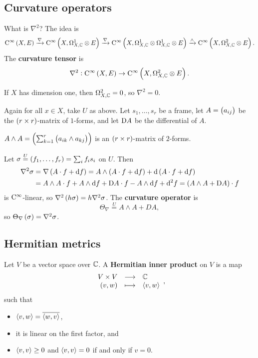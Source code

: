 \subsection{Curvature operators}

What is $ \nabla^2 $? The idea is
$$ \C^\infty\br{X, E} \xrightarrow{\nabla} \C^\infty\br{X, \Omega_{X, \CC}^1 \otimes E} \xrightarrow{\nabla} \C^\infty\br{X, \Omega_{X, \CC}^1 \otimes \Omega_{X, \CC}^1 \otimes E} \xrightarrow{\wedge} \C^\infty\br{X, \Omega_{X, \CC}^2 \otimes E}. $$
The \textbf{curvature tensor} is
$$ \nabla^2 : \C^\infty\br{X, E} \to \C^\infty\br{X, \Omega_{X, \CC}^2 \otimes E}. $$

\begin{remark*}
If $ X $ has dimension one, then $ \Omega_{X, \mathbb{C}}^2 = 0 $, so $ \nabla^2 = 0 $.
\end{remark*}

Again for all $ x \in X $, take $ U $ as above. Let $ s_1, \dots, s_r $ be a frame, let $ A = \br{a_{ij}} $ be the $ \br{r \times r} $-matrix of $ 1 $-forms, and let $ \mathrm{D} A $ be the differential of $ A $.

\begin{notation*}
$ A \wedge A = \br{\sum_{k = 1}^r \br{a_{ik} \wedge a_{kj}}} $ is an $ \br{r \times r} $-matrix of $ 2 $-forms.
\end{notation*}

Let $ \sigma \overset{U}{=} \br{f_1, \dots, f_r} = \sum_i f_is_i $ on $ U $. Then
\begin{align*}
\nabla^2\sigma
& = \nabla\br{A \cdot f + \d f}
= A \wedge \br{A \cdot f + \d f} + \d\br{A \cdot f + \d f} \\
& = A \wedge A \cdot f + A \wedge \d f + \D A \cdot f - A \wedge \d f + \d^2f
= \br{A \wedge A + \D A} \cdot f
\end{align*}
is $ \mathrm{C}^\infty $-linear, so $ \nabla^2\br{h\sigma} = h\nabla^2\sigma $. The \textbf{curvature operator} is
$$ \Theta_\nabla \overset{U}{=} A \wedge A + DA, $$
so $ \Theta_\nabla\br{\sigma} = \nabla^2\sigma $.

\subsection{Hermitian metrics}

\begin{definition}
Let $ V $ be a vector space over $ \mathbb{C} $. A \textbf{Hermitian inner product} on $ V $ is a map
$$ \function{V \times V}{\CC}{\br{v, w}}{\abr{v, w}}, $$
such that
\begin{itemize}
\item $ \left\langle v, w \right\rangle = \overline{\left\langle w, v \right\rangle} $,
\item it is linear on the first factor, and
\item $ \left\langle v, v \right\rangle \ge 0 $ and $ \left\langle v, v \right\rangle = 0 $ if and only if $ v = 0 $.
\end{itemize}
\end{definition}

